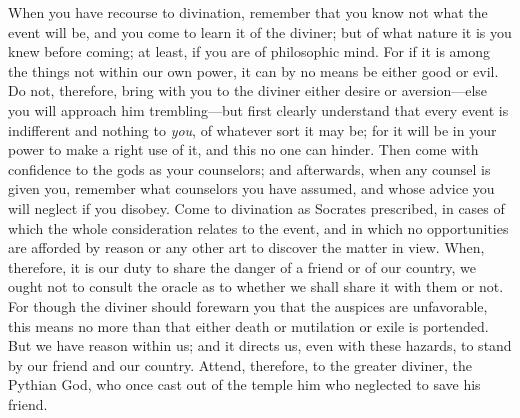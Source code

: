 When you have recourse to divination, remember that you know not what the event
will be, and you come to learn it of  the diviner; but of what nature it is you
knew before  coming; at least,  if you  are of philosophic  mind. For if  it is
among the things not within our own power, it can by no means be either good or
evil.  Do not,  therefore,  bring with  you  to the  diviner  either desire  or
aversion---else you will approach  him trembling---but first clearly understand
that every event is indifferent and  nothing to \emph{you}, of whatever sort it
may be; for it will be in your power to make a right use of it, and this no one
can  hinder. Then  come with  confidence to  the gods  as your  counselors; and
afterwards, when  any counsel is given  you, remember what counselors  you have
assumed, and whose  advice you will neglect if you  disobey. Come to divination
as Socrates  prescribed, in cases of  which the whole consideration  relates to
the event, and  in which no opportunities  are afforded by reason  or any other
art to discover  the matter in view.  When, therefore, it is our  duty to share
the danger of a friend or of our country, we ought not to consult the oracle as
to whether we  shall share it with  them or not. For though  the diviner should
forewarn you  that the auspices are  unfavorable, this means no  more than that
either death or mutilation or exile is portended. But we have reason within us;
and it  directs us, even  with these  hazards, to stand  by our friend  and our
country. Attend, therefore,  to the greater diviner, the Pythian  God, who once
cast  out of  the temple  him who  neglected to  save his  friend.\footnotemark
{}
